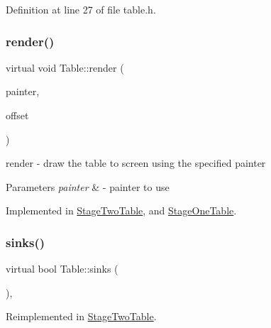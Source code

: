 Definition at line 27 of file table.\+h.

\mbox{\label{class_table_a827dac18920a95b3e0ef006183514654}} 
\subsubsection{\texorpdfstring{render()}{render()}}
{\footnotesize\ttfamily virtual void Table\+::render (\begin{DoxyParamCaption}\item[{Q\+Painter \&}]{painter,  }\item[{const Q\+Vector2D \&}]{offset }\end{DoxyParamCaption})\hspace{0.3cm}{\ttfamily [pure virtual]}}



render -\/ draw the table to screen using the specified painter 


\begin{DoxyParams}{Parameters}
{\em painter} & -\/ painter to use \\
\hline
\end{DoxyParams}


Implemented in \mbox{\hyperlink{class_stage_two_table_ad19f7aa333b65d84b67ce2e55330a669}{Stage\+Two\+Table}}, and \mbox{\hyperlink{class_stage_one_table_a1f6dac59ce45c370f94fb3710f744ceb}{Stage\+One\+Table}}.

\mbox{\label{class_table_ab3eb192b2a06e26349d651e4e6de063a}} 
\subsubsection{\texorpdfstring{sinks()}{sinks()}}
{\footnotesize\ttfamily virtual bool Table\+::sinks (\begin{DoxyParamCaption}\item[{\mbox{\hyperlink{class_ball}{Ball}} $\ast$}]{ }\end{DoxyParamCaption})\hspace{0.3cm}{\ttfamily [inline]}, {\ttfamily [virtual]}}



Reimplemented in \mbox{\hyperlink{class_stage_two_table_a3e015671be449da741adaf86e00ec844}{Stage\+Two\+Table}}.



